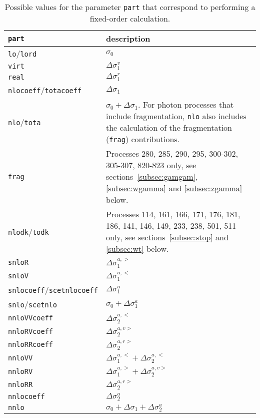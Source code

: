 \begin{longtable}{p{4.5cm}p{9.0cm}}
\caption{Possible values for the parameter \texttt{part} that correspond to
performing a fixed-order calculation. \label{tab:partchoicesfo}} \\
		\hline
		\texttt{part} & description\\
		\hline
			 {\tt lo}/{\tt lord} &
			$\sigma_0$
			\\
			 {\tt virt} &
			$\Delta\sigma_1^v$
			\\
			 {\tt real} &
			$\Delta\sigma_1^r$
			\\
			 {\tt nlocoeff}/{\tt totacoeff} &
			$\Delta\sigma_1$
			\\
			 {\tt nlo}/{\tt tota} &
			$\sigma_0+\Delta\sigma_1$. For photon processes that include fragmentation,
			{\tt nlo} also includes the calculation of the fragmentation ({\tt frag})
			contributions.
			\\
			 {\tt frag} &
			Processes 280, 285, 290, 295, 300-302, 305-307,  820-823 only, see sections~\ref{subsec:gamgam},
			\ref{subsec:wgamma} and
			\ref{subsec:zgamma} below.
			\\
			 {\tt nlodk}/{\tt todk} &
			Processes 114, 161, 166, 171, 176, 181, 186, 141, 146, 149, 233, 238, 501, 511 only, see
			sections~\ref{subsec:stop} and
			\ref{subsec:wt} below.
			\\
                         {\tt snloR} & $\Delta\sigma_1^{a,>}$
			 \\
                         {\tt snloV} & $\Delta\sigma_1^{a,<}$
			 \\
                         {\tt snlocoeff}/{\tt scetnlocoeff} & $\Delta\sigma_1^a$
			 \\
                         {\tt snlo}/{\tt scetnlo} & $\sigma_0 + \Delta\sigma_1^a$
			 \\
                         {\tt nnloVVcoeff} & $\Delta\sigma_2^{a,<}$
			 \\
                         {\tt nnloRVcoeff} & $\Delta\sigma_2^{a,v>}$
			 \\
                         {\tt nnloRRcoeff} & $\Delta\sigma_2^{a,r>}$
			 \\
                         {\tt nnloVV} & $\Delta\sigma_1^{a,<} + \Delta\sigma_2^{a,<}$
			 \\
                         {\tt nnloRV} & $\Delta\sigma_1^{a,>} + \Delta\sigma_2^{a,v>}$
			 \\
                         {\tt nnloRR} & $\Delta\sigma_2^{a,r>}$
			 \\
                         {\tt nnlocoeff} & $\Delta\sigma_2^{a}$
			 \\
			 {\tt nnlo} & $\sigma_0 + \Delta\sigma_1 + \Delta\sigma_2^{a}$
\end{longtable}

